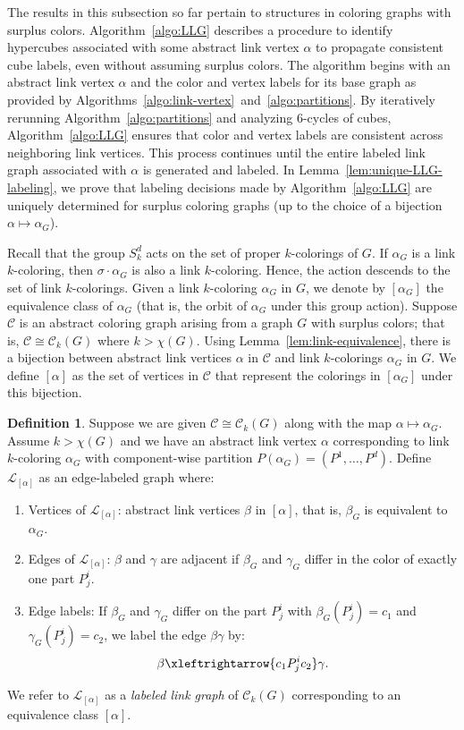 \documentclass{amsart}
\theoremstyle{hypothesisstyle}
\theoremstyle{definition}
\newtheorem{definition}[theorem]{Definition}
\theoremstyle{remark}
\numberwithin{equation}{section}
\newcommand{\C}{\mathcal C}
\begin{document}
The results in this subsection so far pertain to structures in coloring graphs with surplus colors. Algorithm~\ref{algo:LLG} describes a procedure to identify hypercubes associated with some abstract link vertex $\alpha$ to propagate consistent cube labels, even without assuming surplus colors. The algorithm begins with an abstract link vertex $\alpha$ and the color and vertex labels for its base graph as provided by Algorithms~\ref{algo:link-vertex}~and~\ref{algo:partitions}. By iteratively rerunning Algorithm~\ref{algo:partitions} and analyzing 6-cycles of cubes, Algorithm~\ref{algo:LLG} ensures that color and vertex labels are consistent across neighboring link vertices. This process continues until the entire labeled link graph associated with $\alpha$ is generated and labeled. In Lemma~\ref{lem:unique-LLG-labeling}, we prove that labeling decisions made by Algorithm~\ref{algo:LLG} are uniquely determined for surplus coloring graphs (up to the choice of a bijection $\alpha\mapsto \alpha_{G}$).

Recall that the group $S_k^{d}$ acts on the set of proper $k$-colorings of $G$. If $\alpha_G$ is a link $k$-coloring, then $\sigma\cdot\alpha_{G}$ is also a link $k$-coloring. Hence, the action descends to the set of link $k$-colorings. Given a link $k$-coloring $\alpha_{G}$ in $G$, we denote by $[\alpha_{G}]$ the equivalence class of $\alpha_{G}$ (that is, the orbit of $\alpha_G$ under this group action). Suppose $\C$ is an abstract coloring graph arising from a graph $G$ with surplus colors; that is, $\C\cong\C_k(G)$ where $k>\chi(G)$. Using Lemma~\ref{lem:link-equivalence}, there is a bijection between abstract link vertices $\alpha$ in $\C$ and link $k$-colorings $\alpha_G$ in $G$. We define $[\alpha]$ as the set of vertices in $\C$ that represent the colorings in 
$[\alpha_G]$ under this bijection. 

\begin{definition}\label{def:labeled-link-graph}
Suppose we are given $\mathcal{C}\cong\C_k(G)$ along with the map $\alpha\mapsto \alpha_G$. Assume  $k>\chi(G)$ and we have an abstract link vertex $\alpha$ corresponding to link $k$-coloring $\alpha_{G}$ with component-wise partition $P(\alpha_G)=(P^1,\dots,P^d)$.  Define $\mathcal{L}_{[\alpha]}$ as an edge-labeled graph where:
   \begin{enumerate}
    \item Vertices of $\mathcal{L}_{[\alpha]}$: abstract link vertices $\beta$ in $[\alpha]$, that is, $\beta_{G}$ is equivalent to $\alpha_G$.
    \item Edges of $\mathcal{L}_{[\alpha]}$: $\beta$ and $\gamma$ are adjacent if $\beta_G$ and $\gamma_G$ differ in the color of exactly one part $P^i_j$.
    \item Edge labels: If $\beta_G$ and $\gamma_G$ differ on the part $P^i_{j}$ with $\beta_{G}(P^{i}_{j})=c_1$ and $\gamma_{G}(P^{i}_{j})=c_2$, we label the edge $\beta\gamma$ by:
    \[
    \beta\xleftrightarrow{c_1 P^i_{j}c_2}  \gamma. 
    \]
\end{enumerate}
We refer to $\mathcal{L}_{[\alpha]}$ as a \emph{labeled link graph} of $\mathcal{C}_{k}(G)$ corresponding to an equivalence class $[\alpha]$.
\end{definition}
\end{document}
